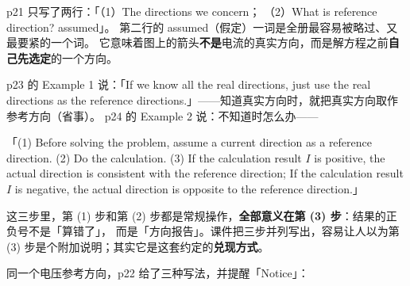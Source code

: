 \documentclass[11pt]{ctexart}
\begin{document}




p21 只写了两行：「（1）The directions we concern； （2）What is reference direction? assumed」。
第二行的 assumed（假定）一词是全册最容易被略过、又最要紧的一个词。
它意味着图上的箭头\textbf{不是}电流的真实方向，而是解方程之前\textbf{自己先选定}的一个方向。

p23 的 Example 1 说：「If we know all the real directions, just use the real directions as the
reference directions.」——知道真实方向时，就把真实方向取作参考方向（省事）。
p24 的 Example 2 说：不知道时怎么办——

\par\medskip\noindent
「(1) Before solving the problem, assume a current direction as a reference direction.
(2) Do the calculation. (3) If the calculation result $I$ is positive, the actual direction is
consistent with the reference direction; If the calculation result $I$ is negative, the actual
direction is opposite to the reference direction.」
\par\medskip

这三步里，第 (1) 步和第 (2) 步都是常规操作，\textbf{全部意义在第 (3) 步}：结果的正负号不是「算错了」，
而是「方向报告」。课件把三步并列写出，容易让人以为第 (3) 步是个附加说明；其实它是这套约定的\textbf{兑现方式}。


同一个电压参考方向，p22 给了三种写法，并提醒「Notice」：
\end{document}
